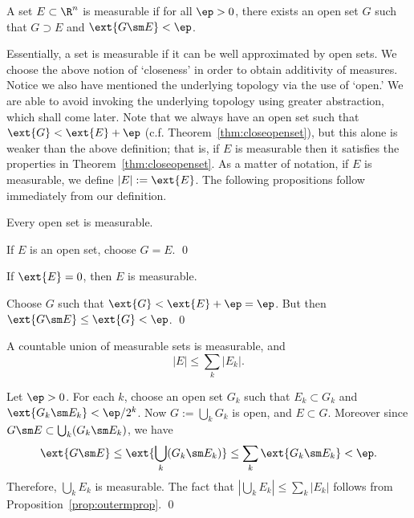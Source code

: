 \begin{dfn}[Measurable]
A set $E \subset \R^n$ is measurable if for all $\ep>0$, there exists an open set $G$ such that $G \supset E$ and $\ext{G \sm E} < \ep$.
\end{dfn}

Essentially, a set is measurable if it can be well approximated by open sets. We choose the above notion of `closeness' in order to obtain additivity of measures. Notice we also have mentioned the underlying topology via the use of `open.' We are able to avoid invoking the underlying topology using greater abstraction, which shall come later. Note that we always have an open set such that $\ext{G} < \ext{E}+\ep$ (c.f. Theorem~\ref{thm:closeopenset}), but this alone is weaker than the above definition; that is, if $E$ is measurable then it satisfies the properties in Theorem~\ref{thm:closeopenset}. As a matter of notation, if $E$ is measurable, we define $|E|:= \ext{E}$. The following propositions follow immediately from our definition.

\begin{prop} \label{prop:openmeasurable}
Every open set is measurable.
\end{prop}

\pf If $E$ is an open set, choose $G=E$. \qed \\


\begin{prop} \label{prop:zeromeasurable}
If $\ext{E}=0$, then $E$ is measurable. 
\end{prop}

\pf Choose $G$ such that $\ext{G}<\ext{E}+\ep=\ep$. But then $\ext{G \sm E} \leq \ext{G}<\ep$. \qed \\

\begin{prop}
A countable union of measurable sets is measurable, and 
	\[
	|E| \leq \sum_k |E_k|.
	\]
\end{prop}

\pf Let $\ep>0$. For each $k$, choose an open set $G_k$ such that $E_k \subset G_k$ and $\ext{G_k\sm E_k}< \ep/2^k$. Now $G:= \bigcup_k G_k$ is open, and $E \subset G$. Moreover since $G \sm E \subset \bigcup_k (G_k \sm E_k)$, we have
	\[
	\ext{G\sm E} \leq \ext{\bigcup_k (G_k \sm E_k)} \leq \sum_k \ext{G_k \sm E_k}< \ep.
	\]
Therefore, $\bigcup_k E_k$ is measurable. The fact that $\left|\bigcup_k E_k\right| \leq \sum_k |E_k|$ follows from Proposition~\ref{prop:outermprop}. \qed \\

